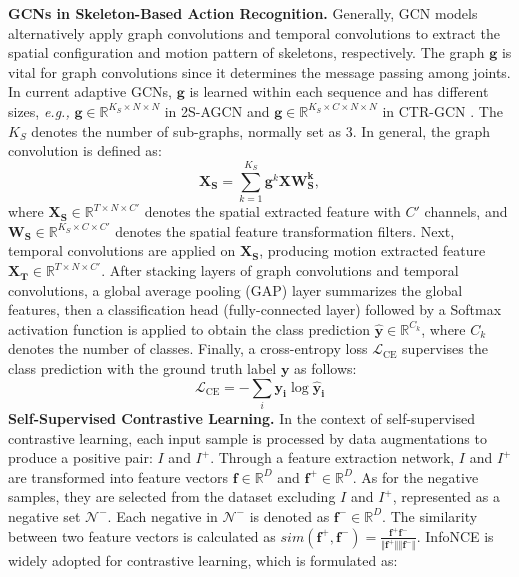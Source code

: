 \documentclass{article} \usepackage{iclr2023_conference,times}
\begin{document}
\noindent \textbf{GCNs in Skeleton-Based Action Recognition.} Generally, GCN models alternatively apply graph convolutions and temporal convolutions to extract the spatial configuration and motion pattern of skeletons, respectively. The graph $\mathbf{g}$ is vital for graph convolutions since it determines the message passing among joints. In current adaptive GCNs, $\mathbf{g}$ is learned within each sequence and has different sizes, \emph{e.g.,} $\mathbf{g} \in \mathbb{R}^{K_S \times N \times N}$ in 2S-AGCN \citep{2SAGCN} and $\mathbf{g} \in \mathbb{R}^{K_S \times C \times N \times N}$ in CTR-GCN \citep{CTRGCN}. The $K_S$ denotes the number of sub-graphs, normally set as 3.
In general, the graph convolution is defined as:
\begin{equation}
    \mathbf{X_S} = \sum_{k=1}^{K_S}{\mathbf{g}^{k}\mathbf{X}\mathbf{W^{k}_S}},
    \label{eq:graph conv}
\end{equation}
where $\mathbf{X_S} \in \mathbb{R}^{T \times N \times C'}$ denotes the spatial extracted feature with $C'$ channels, and $\mathbf{W_S} \in \mathbb{R}^{K_S \times C \times C'}$ denotes the spatial feature transformation filters. Next, temporal convolutions are applied on $\mathbf{X_S}$, producing motion extracted feature $\mathbf{X_T} \in \mathbb{R}^{T \times N \times C'}$. After stacking layers of graph convolutions and temporal convolutions, a global average pooling (GAP) layer summarizes the global features, then a classification head (fully-connected layer) followed by a Softmax activation function is applied to obtain the class prediction $\mathbf{\mathbf{\hat{y}}} \in \mathbb{R}^{C_k}$, where $C_k$ denotes the number of classes. Finally, a cross-entropy loss $\mathcal{L}_\text{CE}$ supervises the class prediction with the ground truth label $\mathbf{y}$ as follows:
\begin{equation}
    \mathcal{L}_\text{CE} = -\sum_i{\mathbf{y_i}\log{\mathbf{\hat{y}_i}}}
\end{equation}
\noindent \textbf{Self-Supervised Contrastive Learning.} In the context of self-supervised contrastive learning, each input sample is processed by data augmentations to produce a positive pair: $I$ and $I^+$. Through a feature extraction network, $I$ and $I^+$ are transformed into feature vectors $\mathbf{f} \in \mathbb{R}^{D}$ and $\mathbf{f^+} \in \mathbb{R}^{D}$. As for the negative samples, they are selected from the dataset excluding $I$ and $I^+$, represented as a negative set $\mathcal{N^-}$. Each negative in $\mathcal{N^-}$ is denoted as $\mathbf{f^-} \in \mathbb{R}^{D}$. The similarity between two feature vectors is calculated as $sim(\mathbf{f^+}, \mathbf{f^-})=\frac{\mathbf{f^+}\mathbf{f^-}}{\Vert \mathbf{f^+} \Vert \Vert \mathbf{f^-} \Vert}$. InfoNCE \citep{nce, oord2018representation} is widely adopted for contrastive learning, which is formulated as:
\end{document}
